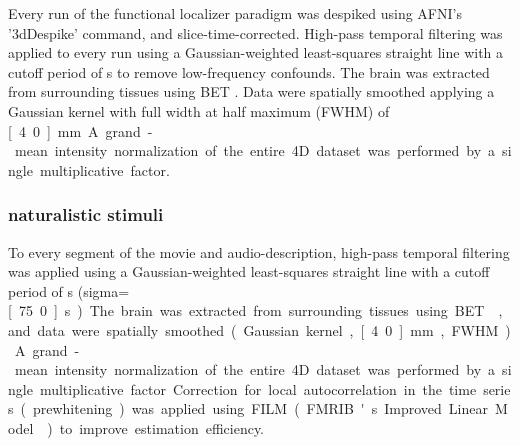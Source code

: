 Every run of the functional localizer paradigm was despiked using AFNI's
\citep{cox1996afni, cox1997software} '3dDespike' command, and
slice-time-corrected.
High-pass temporal filtering was applied to every run using a Gaussian-weighted
least-squares straight line with a cutoff period of \unit[100]{s} to remove
low-frequency confounds.
The brain was extracted from surrounding tissues using BET \citep{smith2002bet}.
Data were spatially smoothed applying a Gaussian kernel with full width at half
maximum (FWHM) of \unit[4.0]{mm}
A grand-mean intensity normalization of the entire 4D dataset was performed by a
single multiplicative factor.

\subsubsection{naturalistic stimuli}




To every segment of the movie and audio-description, high-pass temporal
filtering was applied using a Gaussian-weighted least-squares straight line with
a cutoff period of \unit[150]{s} (sigma=\unit[75.0]{s}).
The brain was extracted from surrounding tissues using BET \citep{smith2002bet},
and data were spatially smoothed (Gaussian kernel, \unit[4.0]{mm}, FWHM).
A grand-mean intensity normalization of the entire 4D dataset was performed by a
single multiplicative factor.
Correction for local autocorrelation in the time series (prewhitening) was
applied using FILM (FMRIB's Improved Linear Model \citep{woolrich2001autocorr})
to improve estimation efficiency.

